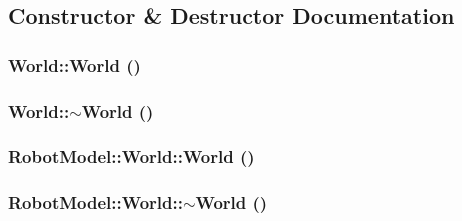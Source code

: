 \subsection{Constructor \& Destructor Documentation}
\hypertarget{class_robot_model_1_1_world_afa39d4e6f714a7a3691ac0c656f5e8a8}{
\subsubsection[{World}]{\setlength{\rightskip}{0pt plus 5cm}World::World ()}}
\label{class_robot_model_1_1_world_afa39d4e6f714a7a3691ac0c656f5e8a8}
\hypertarget{class_robot_model_1_1_world_a8c73fba541a5817fff65147ba47cd827}{
\subsubsection[{$\sim$World}]{\setlength{\rightskip}{0pt plus 5cm}World::$\sim$World ()}}
\label{class_robot_model_1_1_world_a8c73fba541a5817fff65147ba47cd827}
\hypertarget{class_robot_model_1_1_world_a807755fd0da7662eb04f0ba39b0f809b}{
\subsubsection[{World}]{\setlength{\rightskip}{0pt plus 5cm}RobotModel::World::World ()}}
\label{class_robot_model_1_1_world_a807755fd0da7662eb04f0ba39b0f809b}
\hypertarget{class_robot_model_1_1_world_ae7d888c14117743b3492fb989c7f875b}{
\subsubsection[{$\sim$World}]{\setlength{\rightskip}{0pt plus 5cm}RobotModel::World::$\sim$World ()}}
\label{class_robot_model_1_1_world_ae7d888c14117743b3492fb989c7f875b}


